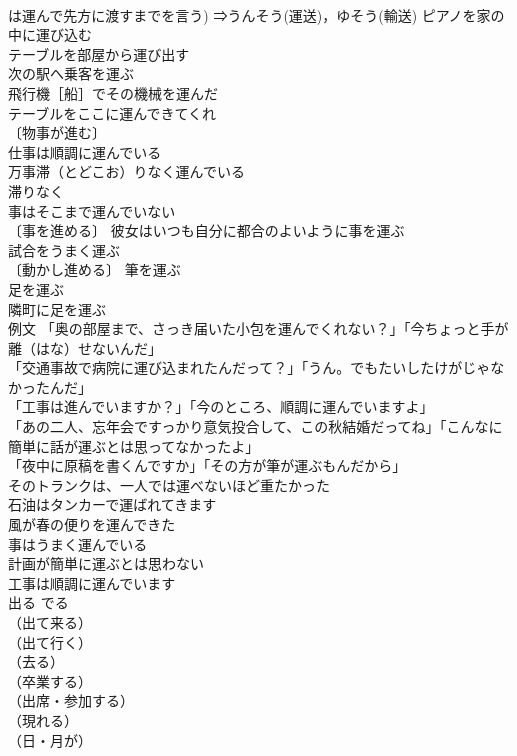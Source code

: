 \documentclass[8pt]{extreport}
\begin{document}
\begin{CJK}{UTF8}{min}
\\	は運んで先方に渡すまでを言う) ⇒うんそう(運送)，ゆそう(輸送) ピアノを家の中に運び込む 
\\	テーブルを部屋から運び出す 
\\	次の駅へ乗客を運ぶ 
\\	飛行機［船］でその機械を運んだ 
\\	テーブルをここに運んできてくれ 
\\	〔物事が進む〕
\\	仕事は順調に運んでいる 
\\	万事滞（とどこお）りなく運んでいる 
\\	滞りなく　
\\	事はそこまで運んでいない 
\\	〔事を進める〕 彼女はいつも自分に都合のよいように事を運ぶ 
\\	試合をうまく運ぶ 
\\	〔動かし進める〕 筆を運ぶ 
\\	足を運ぶ 
\\	隣町に足を運ぶ 
\\	例文 「奥の部屋まで、さっき届いた小包を運んでくれない？」「今ちょっと手が離（はな）せないんだ」 
\\	「交通事故で病院に運び込まれたんだって？」「うん。でもたいしたけがじゃなかったんだ」 
\\	「工事は進んでいますか？」「今のところ、順調に運んでいますよ」 
\\	「あの二人、忘年会ですっかり意気投合して、この秋結婚だってね」「こんなに簡単に話が運ぶとは思ってなかったよ」 
\\	「夜中に原稿を書くんですか」「その方が筆が運ぶもんだから」 
\\	そのトランクは、一人では運べないほど重たかった 
\\	石油はタンカーで運ばれてきます 
\\	風が春の便りを運んできた 
\\	事はうまく運んでいる 
\\	計画が簡単に運ぶとは思わない 
\\	工事は順調に運んでいます 
\\	出る	でる	
\\	（出て来る）
\\	（出て行く）
\\	（去る）
\\	（卒業する）
\\	（出席・参加する）
\\	（現れる）
\\	（日・月が）

\end{CJK}
\end{document}
